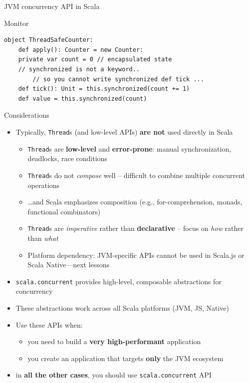 \documentclass[presentation, 9pt]{beamer}\mode<presentation>{\usetheme{AMSBolognaFC}}
\begin{document}
\begin{frame}{JVM concurrency API in Scala}
\begin{itemize}
\begin{alertblock}{Monitor}
\begin{itemize}
\begin{tcolorbox}[left=0pt, top=0pt, bottom=0pt]
\begin{verbatim}
object ThreadSafeCounter:
	def apply(): Counter = new Counter:
    private var count = 0 // encapsulated state
    // synchronized is not a keyword.. 
		// so you cannot write synchronized def tick ...
    def tick(): Unit = this.synchronized(count += 1)
    def value = this.synchronized(count)
					\end{verbatim}
				\end{tcolorbox}
			\end{itemize}
		\end{alertblock}
	\end{itemize}
\end{frame}
\begin{frame}{Considerations}
	\begin{itemize}
		\item Typically, \texttt{Thread}s (and low-level APIs) \textbf{are not} used directly in Scala
  	\begin{itemize}
			\item \texttt{Thread}s are \textbf{low-level} and \textbf{error-prone}: manual synchronization, deadlocks, race conditions
			\item \texttt{Thread}s do not \emph{compose} well -- difficult to combine multiple concurrent operations
			\item \dots and Scala emphasizes composition (e.g., for-comprehension, monads, functional combinators)
			\item \texttt{Thread}s are \emph{imperative} rather than \textbf{declarative} -- focus on \emph{how} rather than \emph{what}
			\item Platform dependency: JVM-specific APIs cannot be used in Scala.js or Scala Native---next lessons
			\end{itemize}
			\item \texttt{scala.concurrent} provides high-level, composable abstractions for concurrency
			\item These abstractions work across all Scala platforms (JVM, JS, Native)
   	\item Use these APIs when:
    \begin{itemize}
		\item you need to build a \textbf{very high-performant} application
			\item you create an application that targets \textbf{only} the JVM ecosystem 
			\end{itemize}
			\item in \textbf{all the other cases}, you should use \texttt{scala.concurrent} API
  \end{itemize}
\end{frame}
\end{document}
